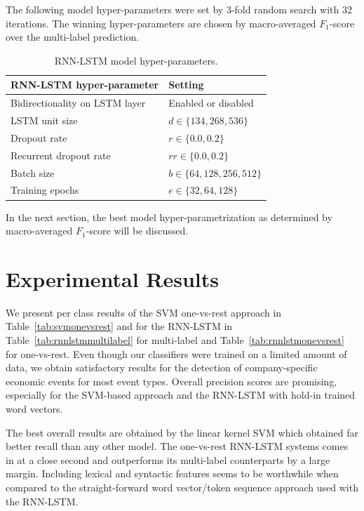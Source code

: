 \documentclass[11pt,a4paper]{article}
\begin{document}
The following model hyper-parameters were set by 3-fold random search with 32 iterations.
The winning hyper-parameters are chosen by macro-averaged $F_1$-score over the multi-label prediction.

\begin{table}[!htb]
	\centering
	\small{
		\begin{tabular}{ll}
			\textbf{RNN-LSTM hyper-parameter} & \textbf{Setting}            \\   
			\hline
			Bidirectionality on LSTM layer         & Enabled or disabled         \\
			LSTM unit size                         & $d\in\{134, 268, 536\}$     \\
			Dropout rate                           & $r\in\{0.0, 0.2\}$          \\
			Recurrent dropout rate                 & $rr\in\{0.0, 0.2\}$         \\
			Batch size                             & $b\in\{64, 128, 256, 512\}$ \\
			Training epochs                        & $e\in\{32, 64, 128\}$       \\
		\end{tabular}
		\caption{RNN-LSTM model hyper-parameters.}
		\label{tab:classifparam}
	}
\end{table}

\noindent In the next section, the best model hyper-parametrization as determined by macro-averaged $F_1$-score will be discussed.

\section{Experimental Results} \label{resultsanddiscussion}

We present per class results of the SVM one-vs-rest approach in Table~\ref{tab:svmonevsrest} and for the RNN-LSTM in Table~\ref{tab:rnnlstmmultilabel} for multi-label and Table~\ref{tab:rnnlstmonevsrest} for one-vs-rest.
Even though our classifiers were trained on a limited amount of data, we obtain satisfactory results for the detection of company-specific economic events for most event types.
Overall precision scores are promising, especially for the SVM-based approach and the RNN-LSTM with hold-in trained word vectors.

The best overall results are obtained by the linear kernel SVM which obtained far better recall than any other model.
The one-vs-rest RNN-LSTM systems comes in at a close second and outperforms its multi-label counterparts by a large margin.
Including lexical and syntactic features seems to be worthwhile when compared to the straight-forward word vector/token sequence approach used with the RNN-LSTM.
\end{document}
